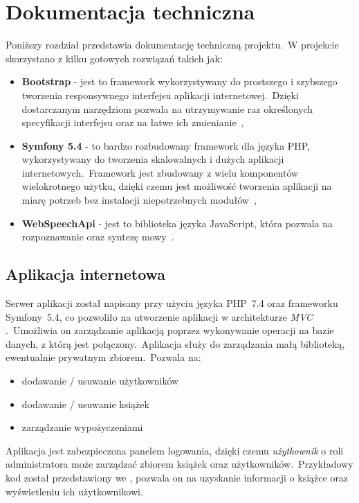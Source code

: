 \chapter{Dokumentacja techniczna}
Poniższy rozdział przedstawia dokumentację techniczną projektu.\ W projekcie skorzystano z kilku gotowych rozwiązań takich jak:
\begin{itemize}
    \item \textbf{Bootstrap} - jest to framework wykorzystywany do prostszego i szybszego tworzenia responsywnego interfejsu aplikacji internetowej.\ Dzięki dostarczanym narzędziom pozwala na utrzymywanie raz określonych specyfikacji interfejsu oraz na łatwe ich zmienianie~\cite{Bootstrap2023},
    \item \textbf{Symfony 5.4} - to bardzo rozbudowany framework dla języka PHP, wykorzystywany do tworzenia skalowalnych i dużych aplikacji internetowych.\ Framework jest zbudowany z wielu komponentów wielokrotnego użytku, dzięki czemu jest możliwość tworzenia aplikacji na miarę potrzeb bez instalacji niepotrzebnych modułów~\cite{Sym2023},
    \item \textbf{WebSpeechApi} - jest to biblioteka języka JavaScript, która pozwala na rozpoznawanie oraz syntezę mowy~\cite{WebSpeechApi}.
\end{itemize}

\section{Aplikacja internetowa}
Serwer aplikacji został napisany przy użyciu języka PHP~7.4 oraz frameworku Symfony~5.4, co pozwoliło na utworzenie aplikacji w architekturze \textit{MVC} .\ Umożliwia on zarządzanie aplikacją poprzez wykonywanie operacji na bazie danych, z którą jest połączony.\ Aplikacja służy do zarządzania małą biblioteką, ewentualnie prywatnym zbiorem.\ Pozwala na:

\begin{itemize}
    \item dodawanie / usuwanie użytkowników
    \item dodawanie / usuwanie książek
    \item zarządzanie wypożyczeniami
\end{itemize}

Aplikacja jest zabezpieczona panelem logowania, dzięki czemu \textit{użytkownik} o roli administratora może zarządzać zbiorem książek oraz użytkowników.\ Przykładowy kod został przedstawiony we , pozwala on na uzyskanie informacji o książce oraz wyświetleniu ich użytkownikowi.
\pagebreak


